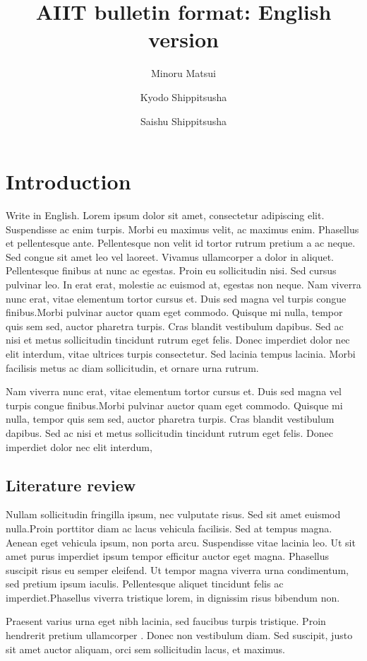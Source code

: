\documentclass[a4paper, 9pt, twocolumn]{extarticle}
\title{AIIT bulletin format: English version}
\author[1*]{Minoru Matsui}
\author[1,2]{Kyodo Shippitsusha}
\author[2,3]{Saishu Shippitsusha}
\affil[1]{Advanced Institute of Industrial Technology}
\affil[2]{Tokyo Metropolitan University}
\affil[3]{Tokyo Metropolitan College of Industrial Technology}
\affil[*]{Corresponding author: Minoru Matsui, xerroxcopy@gmail.com}
\begin{document}



\section{Introduction}

Write in English. Lorem ipsum dolor sit amet, consectetur adipiscing elit. Suspendisse ac enim turpis. Morbi eu maximus velit, ac maximus enim. Phasellus et pellentesque ante. Pellentesque non velit id tortor rutrum pretium a ac neque. Sed congue sit amet leo vel laoreet. Vivamus ullamcorper a dolor in aliquet. Pellentesque finibus at nunc ac egestas. Proin eu sollicitudin nisi. Sed cursus pulvinar leo. In erat erat, molestie ac euismod at, egestas non neque. Nam viverra nunc erat, vitae elementum tortor cursus et. Duis sed magna vel turpis congue finibus.Morbi pulvinar auctor quam eget commodo. Quisque mi nulla, tempor quis sem sed, auctor pharetra turpis. Cras blandit vestibulum dapibus. Sed ac nisi et metus sollicitudin tincidunt rutrum eget felis. Donec imperdiet dolor nec elit interdum, vitae ultrices turpis consectetur. Sed lacinia tempus lacinia. Morbi facilisis metus ac diam sollicitudin, et ornare urna rutrum. 

Nam viverra nunc erat, vitae elementum tortor cursus et. Duis sed magna vel turpis congue finibus.Morbi pulvinar auctor quam eget commodo. Quisque mi nulla, tempor quis sem sed, auctor pharetra turpis. Cras blandit vestibulum dapibus. Sed ac nisi et metus sollicitudin tincidunt rutrum eget felis. Donec imperdiet dolor nec elit interdum, 

\subsection*{Literature review}

Nullam sollicitudin fringilla ipsum, nec vulputate risus. Sed sit amet euismod nulla.Proin porttitor diam ac lacus vehicula facilisis. Sed at tempus magna. Aenean eget vehicula ipsum, non porta arcu. Suspendisse vitae lacinia leo. Ut sit amet purus imperdiet ipsum tempor efficitur auctor eget magna. Phasellus suscipit risus eu semper eleifend. Ut tempor magna viverra urna condimentum, sed pretium ipsum iaculis. Pellentesque aliquet tincidunt felis ac imperdiet.Phasellus viverra tristique lorem, in dignissim risus bibendum non. 

Praesent varius urna eget nibh lacinia, sed faucibus turpis tristique. Proin hendrerit pretium ullamcorper . Donec non vestibulum diam. Sed suscipit, justo sit amet auctor aliquam, orci sem sollicitudin lacus, et maximus\cite{Cooney2017-yt}.

\printbibliography
% 
\end{document}
